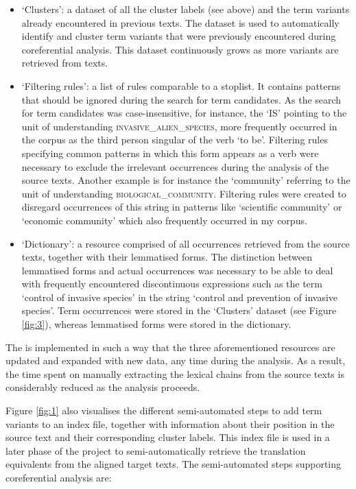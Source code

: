 \documentclass[output=paper]{langsci/langscibook.cls}
\begin{document}
\begin{itemize}

\item `Clusters': a dataset of all the cluster labels (see above) and the term variants 
already encountered in previous texts. The dataset is used to automatically identify 
and cluster term variants that were previously encountered during coreferential 
analysis. This dataset continuously grows as more variants are retrieved from texts. 

\item  `Filtering rules': a list of rules comparable to a stoplist. It contains patterns 
that should be ignored during the search for term candidates. As the search for 
term candidates was case-insensitive, for instance, the  `IS' pointing 
to the unit of understanding \textsc{invasive\_alien\_species}, more frequently 
occurred in the corpus as the third person singular of the verb `to be'. Filtering 
rules specifying common patterns in which this form appears as a verb were necessary 
to exclude the irrelevant occurrences during the analysis of the source texts. 
Another example is for instance the  `community' referring to the 
unit of understanding \textsc{biological\_community}. Filtering rules were created 
to disregard occurrences of this string in patterns like `scientific community' 
or `economic community' which also frequently occurred in my corpus.

\item `Dictionary': a resource comprised of all occurrences retrieved from the source 
texts, together with their lemmatised forms. The distinction between lemmatised 
forms and actual occurrences was necessary to be able to deal with frequently encountered 
discontinuous  expressions such as the term `control of invasive species' 
in the string `control and prevention of invasive species'. Term occurrences were 
stored in the `Clusters' dataset (see Figure \ref{fig:3}), whereas lemmatised forms were stored 
in the dictionary.

\end{itemize}

The  is implemented in such a way that the three aforementioned 
resources are updated and expanded with new data, any time during the analysis. 
As a result, the time spent on manually extracting the lexical chains from the 
source texts is considerably reduced as the analysis proceeds.

Figure \ref{fig:1} also visualises the different semi-automated steps to add term variants 
to an index file, together with information about their position in the source 
text and their corresponding cluster labels. This index file is used in a later 
phase of the project to semi-automatically retrieve the translation equivalents 
from the aligned target texts. The semi-automated steps supporting coreferential 
analysis are:
\end{document}
